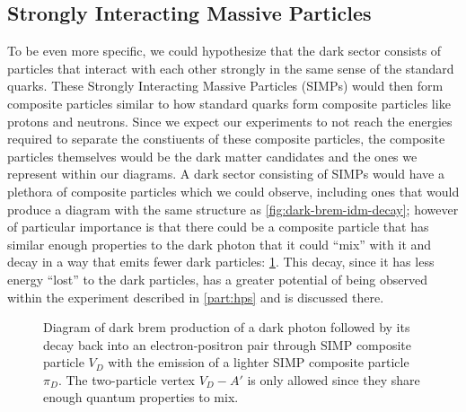 \subsection{Strongly Interacting Massive Particles}
\label{sec:theory-simps}

To be even more specific, we could hypothesize that the dark sector consists of particles that
interact with each other strongly in the same sense of the standard quarks. These Strongly
Interacting Massive Particles (SIMPs) \cite{simp-mechanism-2014,simp-pheno-2018} would then form composite particles similar to how standard
quarks form composite particles like protons and neutrons. Since we expect our experiments to
not reach the energies required to separate the constiuents of these composite particles,
the composite particles themselves would be the dark matter candidates and the ones we represent
within our diagrams. A dark sector consisting of SIMPs would have a plethora of composite particles
which we could observe, including ones that would produce a diagram with the same structure as
\cref{fig:dark-brem-idm-decay}; however of particular importance is that there could be a composite
particle that has similar enough properties to the dark photon that it could ``mix'' with it and
decay in a way that emits fewer dark particles: \cref{fig:dark-brem-simp-decay}. This decay, since
it has less energy ``lost'' to the dark particles, has a greater potential of being observed within
the experiment described in \cref{part:hps} and is discussed there.

\begin{figure}
	\centering
	\caption{
		Diagram of dark brem production of a dark photon followed by its decay back into an electron-positron pair
		through SIMP composite particle $V_D$ with the emission of a lighter SIMP composite particle $\pi_D$.
		The two-particle vertex $V_D-A'$ is only allowed since they share enough quantum properties to mix.
	}
	\label{fig:dark-brem-simp-decay}
\end{figure}


